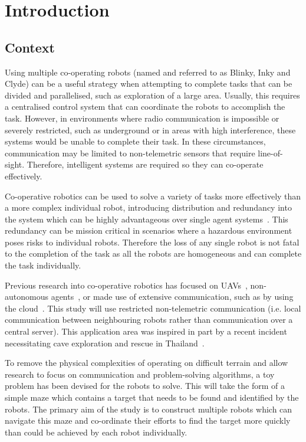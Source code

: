 
\chapter{Introduction}\label{introduction}
\section{Context}\label{introduction/context}
Using multiple co-operating robots (named and referred to as Blinky, Inky
and Clyde) can be a useful strategy when attempting to complete tasks that
can be divided and parallelised, such as exploration of a large area.
Usually, this requires a centralised control system that can
coordinate the robots to accomplish the task. However, in
environments where radio communication is impossible or severely restricted,
such as underground or in areas with high interference, these systems would
be unable to complete their task. In these circumstances, communication may
be limited to non-telemetric sensors that require line-of-sight. Therefore,
intelligent systems are required so they can co-operate effectively.

Co-operative robotics can be used to solve a variety of tasks more 
effectively than a more complex individual robot, introducing distribution
and redundancy into the system which can be highly advantageous over single 
agent systems~\cite{dudek96}. This redundancy can be mission critical in 
scenarios where a hazardous environment poses risks to individual robots. 
Therefore the loss of any single robot is not fatal to the completion of the task as all
the robots are homogeneous and can complete the task individually.

Previous research into co-operative robotics has focused on UAVs~\cite{khan18},
non-autonomous agents~\cite{jimenez18}, or made use of extensive
communication, such as by using the cloud~\cite{wensing2018cooperative}.
This study will use restricted non-telemetric communication (i.e. local 
communication between neighbouring robots rather than communication over a 
central server). This
application area was inspired in part by a recent incident necessitating cave 
exploration and rescue in Thailand~\cite{bbcthailand}.

To remove the physical complexities of operating on difficult
terrain and allow research to focus on communication and problem-solving 
algorithms, a toy problem has been devised for the robots to solve. This
will take the form of a simple maze which contains a target that needs to
be found and identified by the robots. The primary aim of the study is to
construct multiple robots which can navigate this maze and co-ordinate their
efforts to find the target more quickly than could be achieved by each robot 
individually.

